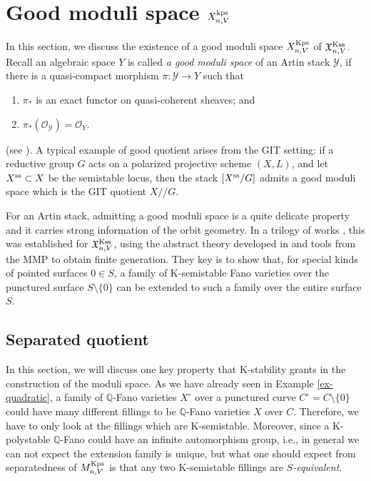 \documentclass[12pt,reqno]{amsart}%
\newcommand{\cY}{{\mathcal{Y}}}
\theoremstyle{definition}
\theoremstyle{remark}
\newcommand{\cO}{{\mathcal{O}}}
\begin{document}
\section{Good moduli space $X^{\rm kps}_{n,V}$}\label{s-kpoly}

In this section, we discuss the existence of a good moduli space ${X}^{\rm Kps}_{n,V}$ of $\mathfrak{X}^{\rm Kss}_{n,V}$. Recall an algebraic space 
$Y$ is called  {\it a good moduli space} of an Artin stack $\cY$, if there is a quasi-compact morphism $\pi\colon \cY\to Y$ such that
\begin{enumerate}
\item $\pi_*$ is an exact functor on quasi-coherent sheaves; and
\item $\pi_*(\mathcal{O}_{\cY})=\cO_Y$.
\end{enumerate}
(see \cite[Def. 4.1]{Alp13}). A typical example of good quotient arises from the GIT setting: if a reductive group $G$ acts on a polarized projective scheme $(X,L)$, and let $X^{\rm ss}\subset X$ be the semistable locus, then the stack $[X^{\rm ss}/G]$ admits a good moduli space which is the GIT quotient $X/\!\!/G$. 

For an Artin stack, admitting a good moduli space  is a quite delicate property and it carries strong information of the orbit geometry. In a trilogy of works \cites{LWX18, BX19, ABHX19}, this was established for $\mathfrak{X}^{\rm Kss}_{n,V}$, using %
 the abstract theory developed in \cite{AHH18} and tools from the MMP to obtain finite generation. They key is to show that, for special kinds of pointed surfaces $0\in S$, a family of K-semistable Fano varieties over the punctured surface $S\setminus\{0\}$ can be extended to such a family  over the entire surface $S$. 

\subsection{Separated quotient}
In this section, we will discuss one key property that K-stability grants in the construction of the moduli space.
As we have already seen in Example \ref{ex-quadratic}, a family of $\mathbb{Q}$-Fano varieties $X^{\circ}$ over a punctured curve $C^{\circ}=C\setminus\{0\}$ could have many different fillings to be $\mathbb{Q}$-Fano varieties $X$ over $C$. Therefore, we have to only look at the fillings which are K-semistable. Moreover, since a K-polystable $\mathbb{Q}$-Fano could have an infinite automorphism group, i.e., in general we can not expect the extension family is unique, but what one should expect from separatedness of $ M^{\rm Kps}_{n,V}$ is that any two K-semistable fillings are {\it $S$-equivalent}. 
\end{document}
